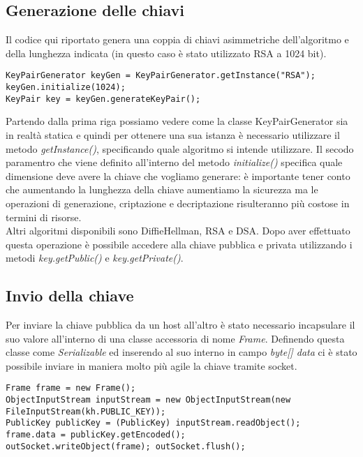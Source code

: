 \documentclass[12pt]{report}
\begin{document}
\newpage

\subsection*{Generazione delle chiavi} 

Il codice qui riportato genera una coppia di chiavi asimmetriche dell'algoritmo e della lunghezza indicata (in questo caso è stato utilizzato RSA a 1024 bit).

\begin{lstlisting}
KeyPairGenerator keyGen = KeyPairGenerator.getInstance("RSA");
keyGen.initialize(1024);
KeyPair key = keyGen.generateKeyPair();
\end{lstlisting}

\noindent
Partendo dalla prima riga possiamo vedere come la classe KeyPairGenerator sia in realtà statica e quindi per ottenere una sua istanza è necessario utilizzare il metodo \textit{getInstance()}, specificando quale algoritmo si intende utilizzare. Il secodo paramentro che viene definito all'interno del metodo \textit{initialize()} specifica quale dimensione deve avere la chiave che vogliamo generare: è importante tener conto che aumentando la lunghezza della chiave aumentiamo la sicurezza ma le operazioni di generazione, criptazione e decriptazione risulteranno più costose in termini di risorse.\\
Altri algoritmi disponibili sono DiffieHellman, RSA e DSA. Dopo aver effettuato questa operazione è possibile accedere alla chiave pubblica e privata utilizzando i metodi \textit{key.getPublic()} e \textit{key.getPrivate()}.

\subsection*{Invio della chiave}

Per inviare la chiave pubblica da un host all'altro è stato necessario incapsulare il suo valore all'interno di una classe accessoria di nome \textit{Frame}. Definendo questa classe come \textit{Serializable} ed inserendo al suo interno in campo \textit{byte[] data} ci è stato possibile inviare in maniera molto più agile la chiave tramite socket.

\begin{lstlisting}
Frame frame = new Frame();
ObjectInputStream inputStream = new ObjectInputStream(new FileInputStream(kh.PUBLIC_KEY));
PublicKey publicKey = (PublicKey) inputStream.readObject();
frame.data = publicKey.getEncoded();
outSocket.writeObject(frame); outSocket.flush();
\end{lstlisting}
\end{document}
